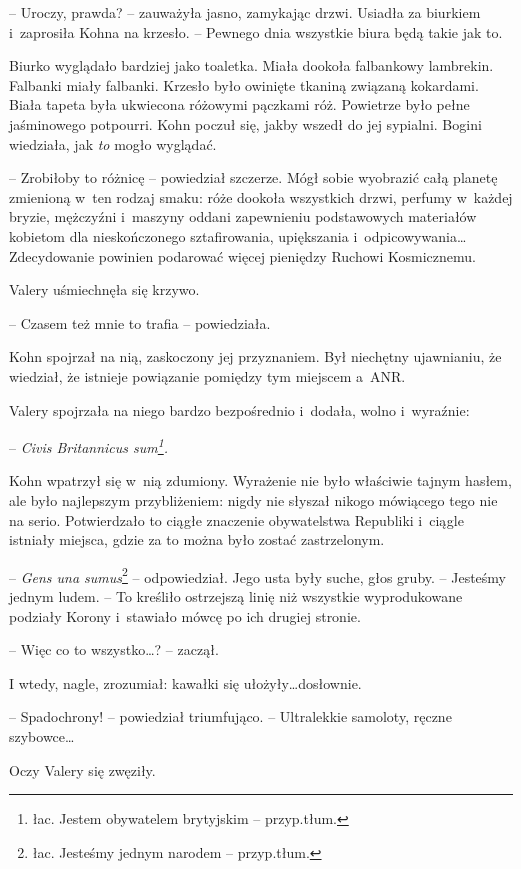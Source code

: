 \documentclass[oneside,polish,11pt,sfheadings]{mwbk}
\begin{document}
-- Uroczy, prawda? -- zauważyła jasno, zamykając drzwi. Usiadła za
biurkiem i~zaprosiła Kohna na krzesło. -- Pewnego dnia wszystkie biura
będą takie jak to.

Biurko wyglądało bardziej jako toaletka. Miała dookoła falbankowy
lambrekin. Falbanki miały falbanki. Krzesło było owinięte tkaniną
związaną kokardami. Biała tapeta była ukwiecona różowymi pączkami róż.
Powietrze było pełne jaśminowego potpourri. Kohn poczuł się, jakby
wszedł do jej sypialni. Bogini wiedziała, jak \emph{to} mogło wyglądać.

-- Zrobiłoby to różnicę -- powiedział szczerze. Mógł sobie wyobrazić całą
planetę zmienioną w~ten rodzaj smaku: róże dookoła wszystkich drzwi,
perfumy w~każdej bryzie, mężczyźni i~maszyny oddani zapewnieniu
podstawowych materiałów kobietom dla nieskończonego sztafirowania,
upiększania i~odpicowywania\ldots Zdecydowanie powinien podarować więcej
pieniędzy Ruchowi Kosmicznemu.

Valery uśmiechnęła się krzywo. 

-- Czasem też mnie to trafia -- powiedziała.

Kohn spojrzał na nią, zaskoczony jej przyznaniem. Był niechętny
ujawnianiu, że wiedział, że istnieje powiązanie pomiędzy tym miejscem a~ANR.

Valery spojrzała na niego bardzo bezpośrednio i~dodała, wolno i~wyraźnie: 

-- \emph{Civis Britannicus sum\footnote{łac. Jestem obywatelem
brytyjskim -- przyp.tłum.}.} 

Kohn wpatrzył się w~nią zdumiony. Wyrażenie nie było właściwie tajnym
hasłem, ale było najlepszym przybliżeniem: nigdy nie słyszał nikogo
mówiącego tego nie na serio. Potwierdzało to ciągłe znaczenie
obywatelstwa Republiki i~ciągle istniały miejsca, gdzie za to można było
zostać zastrzelonym.

-- \emph{Gens una sumus}\footnote{łac. Jesteśmy jednym narodem
-- przyp.tłum.} -- odpowiedział.  Jego usta były suche, głos gruby. -- Jesteśmy jednym ludem.
-- To kreśliło ostrzejszą linię niż wszystkie wyprodukowane podziały
Korony i~stawiało mówcę po ich drugiej stronie.

-- Więc co to wszystko\ldots? -- zaczął.

I wtedy, nagle, zrozumiał: kawałki się ułożyły\ldots dosłownie.

-- Spadochrony! -- powiedział triumfująco. -- Ultralekkie samoloty, ręczne
szybowce\ldots

Oczy Valery się zwęziły. 
\end{document}
